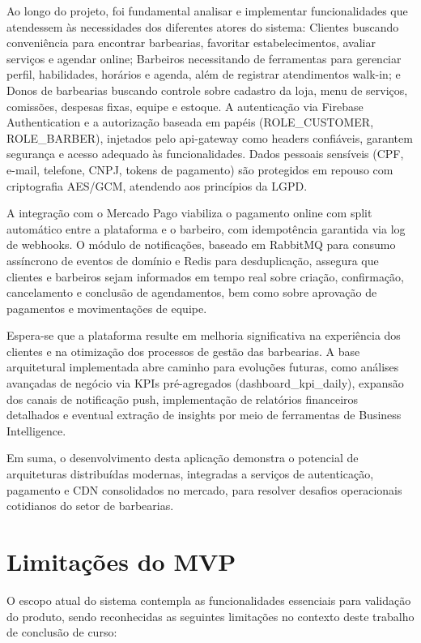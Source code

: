 \documentclass[
    12pt, 
    a4paper, 
    oneside, 
    chapter=TITLE, 
    section=TITLE
]{abntex2}
\begin{document}
Ao longo do projeto, foi fundamental analisar e implementar funcionalidades que atendessem às necessidades dos diferentes atores do sistema: Clientes buscando conveniência para encontrar barbearias, favoritar estabelecimentos, avaliar serviços e agendar online; Barbeiros necessitando de ferramentas para gerenciar perfil, habilidades, horários e agenda, além de registrar atendimentos walk-in; e Donos de barbearias buscando controle sobre cadastro da loja, menu de serviços, comissões, despesas fixas, equipe e estoque. A autenticação via Firebase Authentication e a autorização baseada em papéis (ROLE\_CUSTOMER, ROLE\_BARBER), injetados pelo api-gateway como headers confiáveis, garantem segurança e acesso adequado às funcionalidades. Dados pessoais sensíveis (CPF, e-mail, telefone, CNPJ, tokens de pagamento) são protegidos em repouso com criptografia AES/GCM, atendendo aos princípios da LGPD.

A integração com o Mercado Pago viabiliza o pagamento online com split automático entre a plataforma e o barbeiro, com idempotência garantida via log de webhooks. O módulo de notificações, baseado em RabbitMQ para consumo assíncrono de eventos de domínio e Redis para desduplicação, assegura que clientes e barbeiros sejam informados em tempo real sobre criação, confirmação, cancelamento e conclusão de agendamentos, bem como sobre aprovação de pagamentos e movimentações de equipe.

Espera-se que a plataforma resulte em melhoria significativa na experiência dos clientes e na otimização dos processos de gestão das barbearias. A base arquitetural implementada abre caminho para evoluções futuras, como análises avançadas de negócio via KPIs pré-agregados (dashboard\_kpi\_daily), expansão dos canais de notificação push, implementação de relatórios financeiros detalhados e eventual extração de insights por meio de ferramentas de Business Intelligence.

Em suma, o desenvolvimento desta aplicação demonstra o potencial de arquiteturas distribuídas modernas, integradas a serviços de autenticação, pagamento e CDN consolidados no mercado, para resolver desafios operacionais cotidianos do setor de barbearias.

\section{Limitações do MVP}
O escopo atual do sistema contempla as funcionalidades essenciais para validação do produto, sendo reconhecidas as seguintes limitações no contexto deste trabalho de conclusão de curso:
\end{document}
